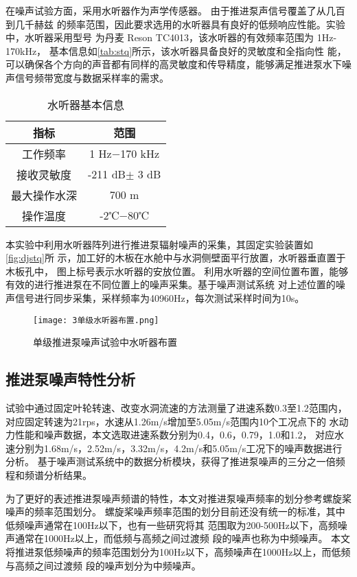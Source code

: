 在噪声试验方面，采用水听器作为声学传感器。
由于推进泵声信号覆盖了从几百到几千赫兹
的频率范围，因此要求选用的水听器具有良好的低频响应性能。实验中，水听器采用型号
为丹麦 Reson TC4013，该水听器的有效频率范围为 1Hz-170kHz，
基本信息如\autoref{tab:stq}所示，该水听器具备良好的灵敏度和全指向性
能，可以确保各个方向的声音都有同样的高灵敏度和传导精度，能够满足推进泵水下噪声信号频带宽度与数据采样率的需求。
\begin{table}[htbp]
    \centering
    \caption{\label{tab:stq}水听器基本信息}
    \begin{tabular}{cc}
     \toprule
     指标&范围\\
     \midrule
     工作频率&1 Hz$- $170 kHz\\
     接收灵敏度&-211 dB$\pm$ 3 dB\\
     最大操作水深&700 m\\
     操作温度&-2℃$- $80℃\\
     \bottomrule
    \end{tabular}
\end{table}

本实验中利用水听器阵列进行推进泵辐射噪声的采集，其固定实验装置如\autoref{fig:djstq}所
示，加工好的木板在水舱中与水洞侧壁面平行放置，水听器垂直置于木板孔中，
图上标号表示水听器的安放位置。
利用水听器的空间位置布置，能够有效的进行推进泵在不同位置上的噪声采集。基于噪声测试系统
对上述位置的噪声信号进行同步采集，采样频率为40960Hz，每次测试采样时间为10s。
\begin{figure}[htbp]
    \centering
    \texttt{[image: 3单级水听器布置.png]}
    \caption{\label{fig:djstq}单级推进泵噪声试验中水听器布置}
\end{figure}
\subsection{推进泵噪声特性分析}
试验中通过固定叶轮转速、改变水洞流速的方法测量了进速系数0.3至1.2范围内，
对应固定转速为21rps，水速从1.26m/s增加至5.05m/s范围内10个工况点下的
水动力性能和噪声数据，本文选取进速系数分别为0.4，0.6，0.79，1.0和1.2，
对应水速分别为1.68m/s，2.52m/s，3.32m/s，4.2m/s和5.05m/s工况下的噪声数据进行分析。
基于噪声测试系统中的数据分析模块，获得了推进泵噪声的三分之一倍频程和频谱分析结果。

为了更好的表述推进泵噪声频谱的特性，本文对推进泵噪声频率的划分参考螺旋桨噪声的频率范围划分。
螺旋桨噪声频率范围的划分目前还没有统一的标准，其中
低频噪声通常在100Hz以下，也有一些研究将其
范围取为200-500Hz以下，高频噪声通常在1000Hz以上，而低频与高频之间过渡频
段的噪声也称为中频噪声。
本文将推进泵低频噪声的频率范围划分为100Hz以下，高频噪声在1000Hz以上，而低频与高频之间过渡频
段的噪声划分为中频噪声。
